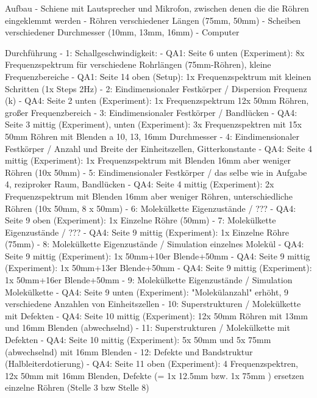 Aufbau
- Schiene mit Lautsprecher und Mikrofon, zwischen denen die die Röhren eingeklemmt werden
- Röhren verschiedener Längen (75mm, 50mm)
- Scheiben verschiedener Durchmesser (10mm, 13mm, 16mm)
- Computer

Durchführung
- 1: Schallgeschwindigkeit:
    - QA1: Seite 6 unten (Experiment): 8x Frequenzspektrum für verschiedene Rohrlängen (75mm-Röhren), kleine Frequenzbereiche
    - QA1: Seite 14 oben (Setup): 1x Frequenzspektrum mit kleinen Schritten (1x Steps 2Hz)
- 2: Eindimensionaler Festkörper / Dispersion Frequenz (k)
    - QA4: Seite 2 unten (Experiment): 1x Frequenzspektrum 12x 50mm Röhren, großer Frequenzbereich
- 3: Eindimensionaler Festkörper / Bandlücken
    - QA4: Seite 3 mittig (Experiment), unten (Experiment): 3x Frequenzspektren mit 15x 50mm Röhren mit Blenden a 10, 13, 16mm Durchmesser
- 4: Eindimensionaler Festkörper / Anzahl und Breite der Einheitszellen, Gitterkonstante
    - QA4: Seite 4 mittig (Experiment): 1x Frequenzspektrum mit Blenden 16mm aber weniger Röhren (10x 50mm)
- 5: Eindimensionaler Festkörper / das selbe wie in Aufgabe 4, reziproker Raum, Bandlücken
    - QA4: Seite 4 mittig (Experiment): 2x Frequenzspektrum mit Blenden 16mm aber weniger Röhren, unterschiedliche Röhren (10x 50mm, 8 x 50mm)
- 6: Molekülkette Eigenzustände / ???
    - QA4: Seite 9 oben (Experiment): 1x Einzelne Röhre (50mm)
- 7: Molekülkette Eigenzustände / ???
    - QA4: Seite 9 mittig (Experiment): 1x Einzelne Röhre (75mm)
- 8: Molekülkette Eigenzustände / Simulation einzelnes Molekül
    - QA4: Seite 9 mittig (Experiment): 1x 50mm+10er Blende+50mm
    - QA4: Seite 9 mittig (Experiment): 1x 50mm+13er Blende+50mm
    - QA4: Seite 9 mittig (Experiment): 1x 50mm+16er Blende+50mm
- 9: Molekülkette Eigenzustände / Simulation Molekülkette
    - QA4: Seite 9 unten (Experiment): "Molekülanzahl" erhöht, 9 verschiedene Anzahlen von Einheitszellen
- 10: Superstrukturen / Molekülkette mit Defekten
    - QA4: Seite 10 mittig (Experiment): 12x 50mm Röhren mit 13mm und 16mm Blenden (abwechselnd)
- 11: Superstrukturen / Molekülkette mit Defekten
    - QA4: Seite 10 mittig (Experiment): 5x 50mm und 5x 75mm (abwechselnd) mit 16mm Blenden
- 12: Defekte und Bandstruktur (Halbleiterdotierung)
    - QA4: Seite 11 oben (Experiment): 4 Frequenzspektren, 12x 50mm mit 16mm Blenden, Defekte (= 1x 12.5mm bzw. 1x 75mm ) ersetzen einzelne Röhren (Stelle 3 bzw Stelle 8)
